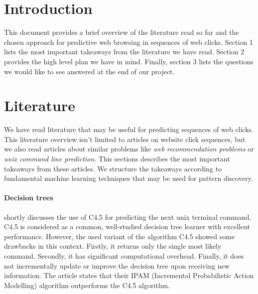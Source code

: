 \documentclass[a4paper,11pt]{article}
\begin{document}



\section{Introduction}
This document provides a brief overview of the literature read so far and the chosen approach for predictive web browsing in sequences of web clicks. Section 1 lists the most important takeaways from the literature we have read. Section 2 provides the high level plan we have in mind. Finally, section 3 lists the questions we would like to see answered at the end of our project.

\section{Literature}
We have read literature that may be useful for predicting sequences of web clicks. This literature overview isn't limited to articles on website click sequences, but we also read articles about similar problems like \textit{web recommendation problems} or \textit{unix command line prediction}. This sections describes the most important takeaways from these articles. We structure the takeaways according to fundamental machine learning techniques that may be used for pattern discovery. 

\paragraph{Decision trees} \cite{davison+hirsch} shortly discusses the use of C4.5 for predicting the next unix terminal command. C4.5 is considered as a common, well-studied decision tree learner with excellent performance. However,  the used variant of the algorithm C4.5 showed some drawbacks in this context. Firstly, it returns only the single most likely command. Secondly, it has significant computational overhead. Finally, it does not incrementally update or improve the decision tree upon receiving new information. The article states that their IPAM (Incremental Probabilistic Action Modelling) algorithm outperforms the C4.5 algorithm.
\end{document}
